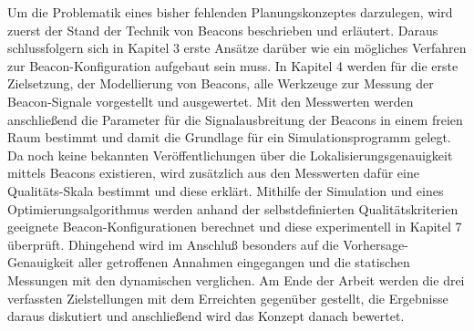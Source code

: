 Um die Problematik eines bisher fehlenden Planungskonzeptes darzulegen, wird zuerst der Stand der Technik von Beacons beschrieben und erläutert. Daraus schlussfolgern sich in Kapitel 3 erste Ansätze darüber wie ein mögliches Verfahren zur Beacon-Konfiguration aufgebaut sein muss. In Kapitel 4 werden für die erste Zielsetzung, der Modellierung von Beacons, alle Werkzeuge zur Messung der Beacon-Signale vorgestellt und ausgewertet. Mit den Messwerten werden anschließend die Parameter für die Signalausbreitung der Beacons in einem freien Raum bestimmt und damit die Grundlage für ein Simulationsprogramm gelegt. Da noch keine bekannten Veröffentlichungen über die Lokalisierungsgenauigkeit mittels Beacons existieren, wird zusätzlich aus den Messwerten dafür eine Qualitäts-Skala bestimmt und diese erklärt. Mithilfe der Simulation und eines Optimierungsalgorithmus werden anhand der selbstdefinierten Qualitätskriterien geeignete Beacon-Konfigurationen berechnet und diese experimentell in Kapitel 7 überprüft. Dhingehend wird im Anschluß besonders auf die Vorhersage-Genauigkeit aller getroffenen Annahmen eingegangen und die statischen Messungen mit den dynamischen verglichen. Am Ende der Arbeit werden die drei verfassten Zielstellungen mit dem Erreichten gegenüber gestellt, die Ergebnisse daraus diskutiert und anschließend wird das Konzept danach bewertet. 
 






%
%
%
%
%
%
%
%
